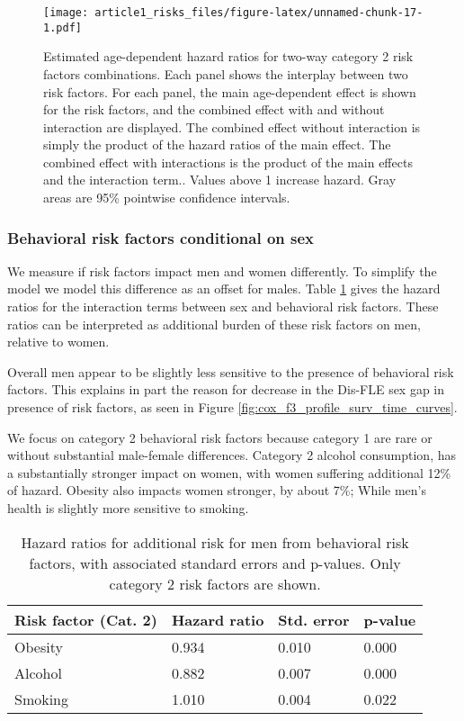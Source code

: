 \documentclass[risks,article,submit,moreauthors,pdftex]{Definitions/mdpi}
\begin{document}
\begin{figure}
\centering
\texttt{[image: article1\_risks\_files/figure-latex/unnamed-chunk-17-1.pdf]}
\caption{\label{fig:cox-f1-tt1-effects-fdr-inter} Estimated
age-dependent hazard ratios for two-way category 2 risk factors
combinations. Each panel shows the interplay between two risk factors.
For each panel, the main age-dependent effect is shown for the risk
factors, and the combined effect with and without interaction are
displayed. The combined effect without interaction is simply the product
of the hazard ratios of the main effect. The combined effect with
interactions is the product of the main effects and the interaction
term.. Values above 1 increase hazard. Gray areas are 95\% pointwise
confidence intervals.}
\end{figure}

\hypertarget{behavioral-risk-factors-conditional-on-sex}{%
\subsubsection{Behavioral risk factors conditional on
sex}\label{behavioral-risk-factors-conditional-on-sex}}

We measure if risk factors impact men and women differently. To simplify
the model we model this difference as an offset for males. Table
\ref{tab:cox-f3-coefs-fdr-inter} gives the hazard ratios for the
interaction terms between sex and behavioral risk factors. These ratios
can be interpreted as additional burden of these risk factors on men,
relative to women.

Overall men appear to be slightly less sensitive to the presence of
behavioral risk factors. This explains in part the reason for decrease
in the Dis-FLE sex gap in presence of risk factors, as seen in Figure
\ref{fig:cox_f3_profile_surv_time_curves}.

We focus on category 2 behavioral risk factors because category 1 are
rare or without substantial male-female differences. Category 2 alcohol
consumption, has a substantially stronger impact on women, with women
suffering additional 12\% of hazard. Obesity also impacts women
stronger, by about 7\%; While men's health is slightly more sensitive to
smoking.

\begin{table}

\caption{\label{tab:cox-f3-coefs-fdr-inter}
            Hazard ratios for additional risk for men from behavioral
            risk factors, with associated standard errors and p-values.
            Only category 2 risk factors are shown.
            }
\centering
\begin{tabular}[t]{llll}
\toprule
Risk factor (Cat. 2) & Hazard ratio & Std. error & p-value\\
\midrule
Obesity & 0.934 & 0.010 & 0.000\\
Alcohol & 0.882 & 0.007 & 0.000\\
Smoking & 1.010 & 0.004 & 0.022\\
\bottomrule
\end{tabular}
\end{table}
\end{document}
